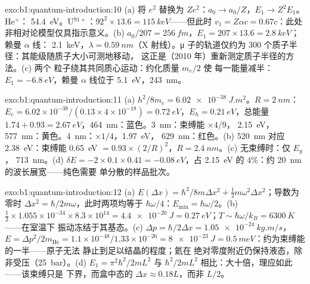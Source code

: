 \begin{solution}{exo:b1:quantum-introduction:10}
(a) 将 $e^2$ 替换为 $Ze^2$：$a_0 \to a_0/Z$，$E_1 \to Z^2E_1$。He$^+$：
\qty{54.4}{eV}。U$^{91+}$：$92^2 \times 13.6 = \qty{115}{keV}$——但此时 $v_1 = Z\alpha c
= 0.67c$：此处非相对论模型仅具指示意义。(b) $a_0/207
= \qty{256}{fm}$，$E_1 = 207 \times 13.6 = \qty{2.8}{keV}$；赖曼 $\alpha$ 线：
\qty{2.1}{keV}，$\lambda = \qty{0.59}{nm}$（X 射线）。μ 子的轨道仅约为
$300$ 个质子半径：其能级随质子大小可测地移动，
这正是（2010 年）重新测定质子半径的方法。(c) 两个
粒子绕其共同质心运动：约化质量 $m_e/2$ 使
每一能量减半：$E_1 = \qty{-6.8}{eV}$，赖曼 $\alpha$ 线位于 \qty{5.1}{eV}，\qty{243}{nm}。
\end{solution}

\begin{solution}{exo:b1:quantum-introduction:11}
(a) $h^2/8m_e = \qty{6.02e-38}{J.m^2}$。$R = \qty{2}{nm}$：$E_e = 6.02 \times 10^{-38}/
(0.13 \times 4 \times 10^{-18}) = \qty{0.72}{eV}$，$E_h = \qty{0.21}{eV}$，总能量 $1.74 +
0.93 = \qty{2.67}{eV}$，\qty{464}{nm}：蓝色。\qty{3}{nm}：束缚能 $\times4/9$，
\qty{2.15}{eV}，\qty{577}{nm}：黄色。\qty{4}{nm}：$\times1/4$，\qty{1.97}{eV}，
\qty{629}{nm}：红色。(b) \qty{520}{nm} 对应 \qty{2.38}{eV}：束缚能 \qty{0.65}{eV}
$= 0.93 \times (2/R)^2$，$R = \qty{2.4}{nm}$。(c) 无束缚时：仅 $E_g$，
\qty{713}{nm}。(d) $\delta E = -2 \times 0.1 \times 0.41 = \qty{-0.08}{eV}$，占
\qty{2.15}{eV} 的 $4\%$：约 \qty{20}{nm} 的波长展宽——纯色需要
单分散的样品批次。
\end{solution}

\begin{solution}{exo:b1:quantum-introduction:12}
(a) $E(\Delta x) = \hbar^2/8m\Delta x^2 + \tfrac12m\omega^2\Delta x^2$；导数为零时
$\Delta x^2 = \hbar/2m\omega$，此时两项均等于 $\hbar\omega/4$：$E_{\min} =
\hbar\omega/2$。(b) $\tfrac12 \times 1.055 \times 10^{-34} \times 8.3 \times 10^{14} = \qty{4.4e-20}{J}
= \qty{0.27}{eV}$；$T \sim \hbar\omega/k_B = \qty{6300}{K}$——在室温下
振动冻结于其基态。(c) $\Delta p = \hbar/2\Delta x =
\qty{1.05e-24}{kg.m/s}$，$E = \Delta p^2/2m_{\mathrm{He}} = 1.1 \times 10^{-48}/1.33 \times
10^{-26} = \qty{8e-23}{J} = \qty{0.5}{meV}$：约为束缚能的一半——原子无法
静止到足以结晶的程度；氦在
绝对零度附近仍保持液态，除非受压（\qty{25}{bar}）。(d) $E_1 = \pi^2\hbar^2/2mL^2$ 与
$\hbar^2/2mL^2$ 相比：大十倍，理应如此——该束缚只是
下界，而盒中态的 $\Delta x \approx 0.18L$，而非 $L/2$。
\end{solution}

